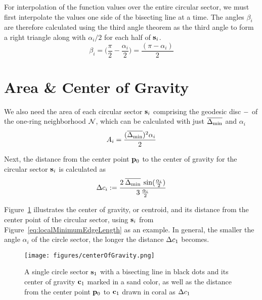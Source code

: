 For interpolation of the function values over the entire circular sector, we must first interpolate the values one side of the bisecting line at a time. The angles $\beta_i$ are therefore calculated using the third angle theorem as the third angle to form a right triangle along with $\alpha_i/2$ for each half of $\mathbf{s}_i$. 
\begin{equation}
	\beta_i = \Big(\frac{\pi}{2} - \frac{\alpha_i}{2}\Big) = \frac{(\pi - \alpha_i)}{2}
	\label{eq:betaFromHalfAlpha}
\end{equation}%
%
%
\section{Area \& Center of Gravity}
\label{cFONSsACG}
We also need the area of each circular sector $\mathbf{s}_i$ comprising the geodesic disc $\mathcal{\Gamma}$ of the one-ring neighborhood $\mathcal{N}$, which can be calculated with just $\overline{\Delta_\text{min}}$ and $\alpha_i$
\begin{equation}
	A_i = \frac{(\overline{\Delta_\text{min}})^2\alpha_i}{2}
	\label{eq:circularSectorArea}
\end{equation}
%
%

Next, the distance from the center point $\mathbf{p}_0$ to the center of gravity for the circular sector $\mathbf{s}_i$ is calculated as
\begin{equation}
	\Delta c_i := \frac{2\:\overline{\Delta_\text{min}}\:\sin(\frac{\alpha_i}{2})}{3\:\frac{\alpha_i}{2}}
	\label{eq:distToCoG}
\end{equation}
%
%

Figure~\ref{fig:centerOfGravity} illustrates the center of gravity, or centroid,  and its distance from the center point of the circular sector, using $\mathbf{s}_i$ from Figure~\ref{eq:localMinimumEdgeLength} as an example. In general, the smaller the angle $\alpha_i$ of the circle sector, the longer the distance $\Delta c_1$ becomes.
\begin{figure}[ht]
\ffigbox
	{\texttt{[image: figures/centerOfGravity.png]}}
	{\caption[Distance to and Center of Gravity]{A single circle sector $\mathbf{s}_1$ with a bisecting line in black dots and its center of gravity $\mathbf{c}_1$ marked in a sand color, as well as the distance from the center point $\mathbf{p}_0$ to $\mathbf{c}_1$ drawn in coral as $\Delta c_1$}\label{fig:centerOfGravity}}
\end{figure}%
%
%
